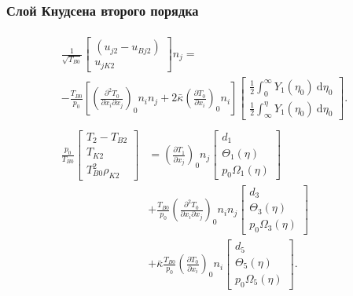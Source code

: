 \documentclass[mathserif]{beamer} %
\newcommand{\dd}{\:\mathrm{d}}
\newcommand{\pder}[2][]{\frac{\partial#1}{\partial#2}}
\newcommand{\pderder}[3][]{\frac{\partial^2#1}{\partial#2\partial#3}}
\newcommand{\onwall}[1]{\left(#1\right)_0}
\begin{document}
\begin{frame}
    \frametitle{Слой Кнудсена второго порядка}
    \footnotesize
    \begin{gather*}
        \begin{multlined}
            \frac1{\sqrt{T_{B0}}}
                \begin{bmatrix} (u_{j2} - u_{Bj2}) \\ u_{jK2} \end{bmatrix} n_j = \\
            - \frac{T_{B0}}{p_0}\left[ \onwall{\pderder[T_0]{x_i}{x_j}}n_i n_j
                + 2\bar\kappa\onwall{\pder[T_0]{x_i}}n_i \right]
                \begin{bmatrix} \frac12\int_0^\infty Y_1(\eta_0)\dd\eta_0 \\
                    \frac12\int_\infty^{\eta} Y_1(\eta_0)\dd\eta_0 \end{bmatrix}.
        \end{multlined}\label{eq:boundary_u2n}\\
        \begin{aligned}
            \frac{p_0}{T_{B0}}
                \begin{bmatrix} T_2 - T_{B2} \\ T_{K2} \\ T_{B0}^2\rho_{K2} \end{bmatrix}
            &= \onwall{\pder[T_1]{x_j}} n_j
                \begin{bmatrix} d_1 \\ \Theta_1(\eta) \\ p_0\Omega_1(\eta) \end{bmatrix} \\
            &+ \frac{T_{B0}}{p_0}\onwall{\pderder[T_0]{x_i}{x_j}} n_i n_j
                \begin{bmatrix} d_3 \\ \Theta_3(\eta) \\ p_0\Omega_3(\eta) \end{bmatrix} \\
            &+ \bar\kappa\frac{T_{B0}}{p_0}\onwall{\pder[T_0]{x_i}} n_i
                \begin{bmatrix} d_5 \\ \Theta_5(\eta) \\ p_0\Omega_5(\eta) \end{bmatrix}.
        \end{aligned}\label{eq:boundary_T2}
    \end{gather*}
\end{frame}
\end{document}
